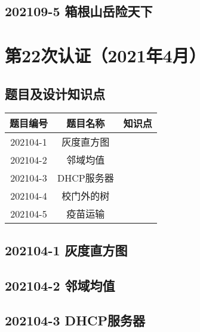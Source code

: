 \documentclass[cn,10pt,math=newtx,citestyle=gb7714-2015,bibstyle=gb7714-2015]{elegantbook}
\newif\ifonlyanalyze %
\begin{document}
\newpage
\section{202109-5 箱根山岳险天下}
\ifonlyanalyze
\else
    
\fi



\chapter{第22次认证（2021年4月）}

\section{题目及设计知识点}

\begin{table}[htbp]
    \centering
    \begin{tabular}{ccc}
        \toprule
        题目编号 & 题目名称   & 知识点 \\
        \midrule
        202104-1 & 灰度直方图 &        \\
        202104-2 & 邻域均值   &        \\
        202104-3 & DHCP服务器 &        \\
        202104-4 & 校门外的树 &        \\
        202104-5 & 疫苗运输   &        \\
        \bottomrule
    \end{tabular}
\end{table}

\newpage
\section{202104-1 灰度直方图}
\ifonlyanalyze
\else
    
\fi


\newpage
\section{202104-2 邻域均值}
\ifonlyanalyze
\else
    
\fi


\newpage
\section{202104-3 DHCP服务器}
\ifonlyanalyze
\else
    
\fi

\end{document}
